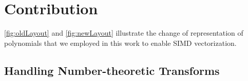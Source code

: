 \section{Contribution}

\figOldLayout
\figNewLayout

\autoref{fig:oldLayout} and \autoref{fig:newLayout} illustrate the change of
representation of polynomials that we employed in this work to enable SIMD
vectorization.

\subsection{Handling Number-theoretic Transforms}


